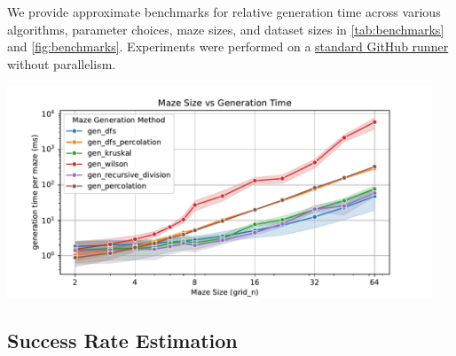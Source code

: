\documentclass[10pt,a4paper,onecolumn]{article}
\let\origfigure\figure
\let\endorigfigure\endfigure
\renewenvironment{figure}[1][2] {
    \expandafter\origfigure\expandafter[H]
} {
    \endorigfigure
}
\begin{document}
We provide approximate benchmarks for relative generation time across
various algorithms, parameter choices, maze sizes, and dataset sizes in
\autoref{tab:benchmarks} and \autoref{fig:benchmarks}. Experiments were
performed on a
\href{https://docs.github.com/en/actions/using-github-hosted-runners/using-github-hosted-runners/about-github-hosted-runners#standard-github-hosted-runners-for-public-repositories}{standard GitHub runner}
without parallelism.



\begin{figure}
\hypertarget{fig:benchmarks}{%
\centering
\includegraphics[width=0.95\textwidth,height=\textheight]{figures/benchmarks/gridsize-vs-gentime.pdf}
\caption{Plot of maze generation time. Generation time scales
exponentially with maze size for all algorithms. Generation time per
maze does not depend on the number of mazes being generated, and there
is minimal overhead to initializing the generation process for a small
dataset. Wilson's algorithm is notably less efficient than others and
has high variance. Note that values are averaged across all parameter
sets for that algorithm. More information can be found on the
\href{https://understanding-search.github.io/maze-dataset/benchmarks/}{benchmarks
page}.}\label{fig:benchmarks}
}
\end{figure}

\hypertarget{sec:success-rate-estimation}{%
\subsection{Success Rate Estimation}\label{sec:success-rate-estimation}}
\end{document}
